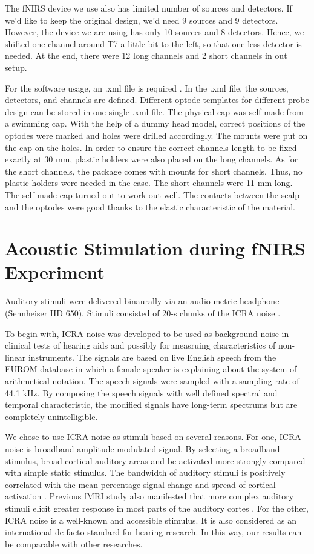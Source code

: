 The fNIRS device we use also has limited number of sources and detectors. If we'd like to keep the original design, we'd need 9 sources and 9 detectors. However, the device we are using has only 10 sources and 8 detectors. Hence, we shifted one channel around T7 a little bit to the left, so that one less detector is needed. At the end, there were 12 long channels and 2 short channels in out setup.

For the software usage, an .xml file is required . In the .xml file, the sources, detectors, and channels are defined. Different optode templates for different probe design can be stored in one single .xml file. The physical cap was self-made from a swimming cap. With the help of a dummy head model, correct positions of the optodes were marked and holes were drilled accordingly. The mounts were put on the cap on the holes. In order to ensure the correct channels length to be fixed exactly at 30 mm, plastic holders were also placed on the long channels. As for the short channels, the  package comes with mounts for short channels. Thus, no plastic holders were needed in the case. The short channels were 11 mm long. The self-made cap turned out to work out well. The contacts between the scalp and the optodes were good thanks to the elastic characteristic of the material.

\section {Acoustic Stimulation during fNIRS Experiment}
Auditory stimuli were delivered binaurally via an audio metric headphone (Sennheiser HD 650). Stimuli consisted of 20-s chunks of the ICRA noise \cite {Dreschler}. 

To begin with, ICRA noise was developed to be used as background noise in clinical tests of hearing aids and possibly for measruing characteristics of non-linear instruments. The signals are based on live English speech from the EUROM database \cite {chanEUROM} in which a female speaker is explaining about the system of arithmetical notation. The speech signals were sampled with a sampling rate of 44.1 kHz. By composing the speech signals with well defined spectral and temporal characteristic, the modified signals have long-term spectrums but are completely unintelligible. 
 
We chose to use ICRA noise as stimuli based on several reasons. For one, ICRA noise is broadband amplitude-modulated signal. By selecting a broadband stimulus, broad cortical auditory areas and be activated more strongly compared with simple static stimulus. The bandwidth of auditory stimuli is positively correlated with the mean percentage signal change and spread of cortical activation \cite {Hall}. Previous fMRI study also manifested that more complex auditory stimuli elicit greater response in most parts of the auditory cortes \cite {Belin}. For the other, ICRA noise is a well-known and accessible stimulus. It is also considered as an international de facto standard for hearing research. In this way, our results can be comparable with other researches.
 
